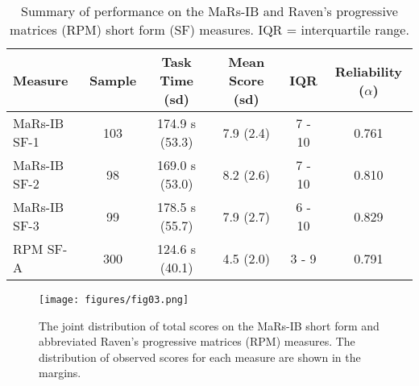 \documentclass[a4paper,man,natbib]{apa6}
\begin{document}
\begin{table}
    \centering
    \begin{tabular*}{\textwidth}{lccccc}
    \toprule
    Measure & Sample & Task Time (sd) & Mean Score (sd) & IQR & Reliability ($\alpha$) \\
    \midrule
    MaRs-IB SF-1 & 103 & 174.9 s (53.3) & 7.9 (2.4) & 7 - 10 & 0.761 \\
    MaRs-IB SF-2 & 98  & 169.0 s (53.0) & 8.2 (2.6) & 7 - 10 & 0.810 \\
    MaRs-IB SF-3 & 99  & 178.5 s (55.7) & 7.9 (2.7) & 6 - 10 & 0.829 \\
    RPM SF-A     & 300 & 124.6 s (40.1) & 4.5 (2.0) & 3 - 9 & 0.791 \\
    \bottomrule
    \end{tabular*}
    \caption{\label{table:3} \normalfont Summary of performance on the MaRs-IB and Raven's progressive matrices (RPM) short form (SF) measures. IQR = interquartile range.}
\end{table}

\begin{figure}
\centering
\texttt{[image: figures/fig03.png]}
\caption{\label{fig:fig03}The joint distribution of total scores on the MaRs-IB short form and abbreviated Raven's progressive matrices (RPM) measures. The distribution of observed scores for each measure are shown in the margins.}
\end{figure}
\end{document}
